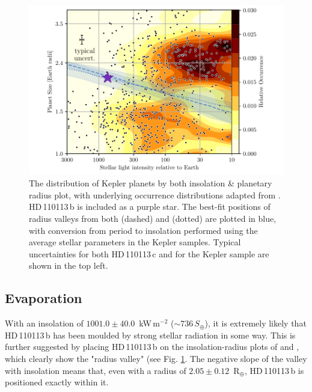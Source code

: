 \documentclass[fleqn,usenatbib]{mnras}
\newcommand{\rearth}{R$_{\oplus}$}
\newcommand{\Trpl}{ $ 2.05 \pm 0.12 $ }
\newcommand{\TSinzero}{ $ 1001.0 \pm 40.0 $ }
\newcommand{\Tplanet}{HD\,110113\,b}
\newcommand{\Tplanetc}{HD\,110113\,c}
\begin{document}
\begin{figure}
	\includegraphics[width=\columnwidth, trim={0.8cm 0.5cm 1.05cm 0.2cm}]{Insolation_TOI755}
    \caption{The distribution of Kepler planets by both insolation \& planetary radius plot, with underlying occurrence distributions adapted from \citep{martinez2019spectroscopic}. \Tplanet{} is included as a purple star. The best-fit positions of radius valleys from both \citet{martinez2019spectroscopic} (dashed) and \citet{van2018asteroseismic} (dotted) are plotted in blue, with conversion from period to insolation performed using the average stellar parameters in the Kepler samples. Typical uncertainties for both \Tplanetc{} and for the Kepler sample are shown in the top left.\label{fig:insolation}
    }
\end{figure}

\subsection{Evaporation}\label{sect:evap}
With an insolation of \TSinzero{}\,kW\,m$^{-2}$ ($\sim736\,S_\oplus$), it is extremely likely that \Tplanet{} has been moulded by strong stellar radiation in some way.
This is further suggested by placing \Tplanet{} on the insolation-radius plots of \citet{fulton2017california} and \citet{martinez2019spectroscopic}, which clearly show the "radius valley" (see Fig. \ref{fig:insolation}.
The negative slope of the valley with insolation means that, even with a radius of \Trpl{}\,\rearth{}, \Tplanet{} is positioned exactly within it.
\end{document}
